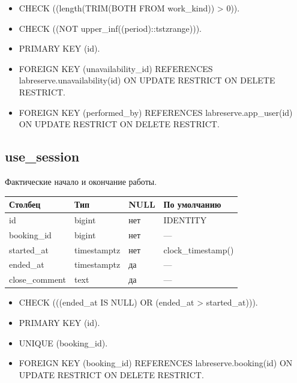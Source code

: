 \begin{itemize}
\item CHECK ((length(TRIM(BOTH FROM work\_\allowbreak{}kind)) > 0)).
\item CHECK ((NOT upper\_\allowbreak{}inf((period)::tstzrange))).
\item PRIMARY KEY (id).
\item FOREIGN KEY (unavailability\_\allowbreak{}id) REFERENCES labreserve.unavailability(id) ON UPDATE RESTRICT ON DELETE RESTRICT.
\item FOREIGN KEY (performed\_\allowbreak{}by) REFERENCES labreserve.app\_\allowbreak{}user(id) ON UPDATE RESTRICT ON DELETE RESTRICT.
\end{itemize}
\par\noindent\begin{minipage}{\linewidth}
\subsection{use\_\allowbreak{}session}
Фактические начало и окончание работы.\par\smallskip\noindent
\begin{tabular}{p{}p{}p{}p{}}
\toprule Столбец & Тип & NULL & По умолчанию \\ \midrule
id & bigint & нет & IDENTITY \\
booking\_\allowbreak{}id & bigint & нет & — \\
started\_\allowbreak{}at & timestamptz & нет & clock\_\allowbreak{}timestamp() \\
ended\_\allowbreak{}at & timestamptz & да & — \\
close\_\allowbreak{}comment & text & да & — \\
\bottomrule\end{tabular}\end{minipage}\par
\begin{itemize}
\item CHECK (((ended\_\allowbreak{}at IS NULL) OR (ended\_\allowbreak{}at > started\_\allowbreak{}at))).
\item PRIMARY KEY (id).
\item UNIQUE (booking\_\allowbreak{}id).
\item FOREIGN KEY (booking\_\allowbreak{}id) REFERENCES labreserve.booking(id) ON UPDATE RESTRICT ON DELETE RESTRICT.
\end{itemize}
